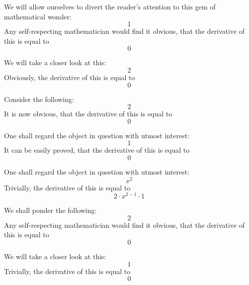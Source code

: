 \documentclass{article}
\begin{document}
We will allow ourselves to divert the reader's attention to this gem of mathematical wonder:
\begin{equation}
1 
\end{equation}
Any self-respecting mathematician would find it obvious, that the derivative of this is equal to
\begin{equation}
0 
\end{equation}

We will take a closer look at this:
\begin{equation}
2 
\end{equation}
Obviously, the derivative of this is equal to
\begin{equation}
0 
\end{equation}

Consider the following:
\begin{equation}
2 
\end{equation}
It is now obvious, that the derivative of this is equal to
\begin{equation}
0 
\end{equation}

One shall regard the object in question with utmost interest:
\begin{equation}
1 
\end{equation}
It can be easily proved, that the derivative of this is equal to
\begin{equation}
0 
\end{equation}

One shall regard the object in question with utmost interest:
\begin{equation}
x ^{2 } 
\end{equation}
Trivially, the derivative of this is equal to
\begin{equation}
2 \cdot x ^{2 - 1 } \cdot 1 
\end{equation}

We shall ponder the following:
\begin{equation}
2 
\end{equation}
Any self-respecting mathematician would find it obvious, that the derivative of this is equal to
\begin{equation}
0 
\end{equation}

We will take a closer look at this:
\begin{equation}
1 
\end{equation}
Trivially, the derivative of this is equal to
\begin{equation}
0 
\end{equation}
\end{document}
